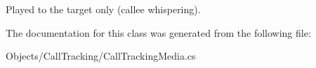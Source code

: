 Played to the target only (callee whispering). 



The documentation for this class was generated from the following file\+:\begin{DoxyCompactItemize}
\item 
Objects/\+Call\+Tracking/Call\+Tracking\+Media.\+cs\end{DoxyCompactItemize}
